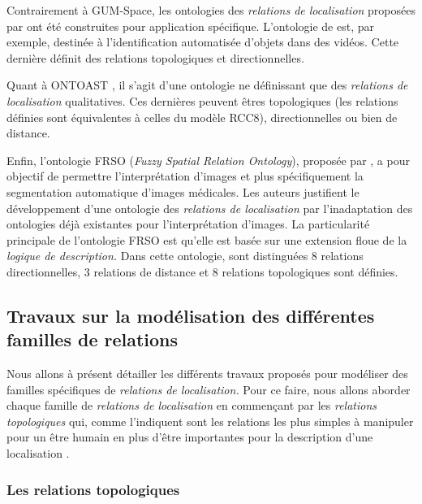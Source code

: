 Contrairement à GUM-Space, les ontologies des \emph{relations de
  localisation} proposées par
\textcite{Dasiopoulou2005,Miron2007,Hudelot2008a} ont été construites
pour application spécifique. L'ontologie de \textcite{Dasiopoulou2005}
est, par exemple, destinée à l'identification automatisée d'objets
dans des vidéos. Cette dernière définit des relations topologiques et
directionnelles.

Quant à ONTOAST \autocite{Miron2007}, il s'agit d'une ontologie ne
définissant que des \emph{relations de localisation} qualitatives. Ces
dernières peuvent êtres topologiques (les relations définies sont
équivalentes à celles du modèle RCC8), directionnelles ou bien de
distance.

Enfin, l'ontologie FRSO (\emph{Fuzzy Spatial Relation Ontology}),
proposée par \textcite{Hudelot2008a}, a pour objectif de permettre
l’interprétation d'images et plus spécifiquement la segmentation
automatique d'images médicales. Les auteurs justifient le
développement d'une ontologie des \emph{relations de localisation} par
l'inadaptation des ontologies déjà existantes pour l'interprétation
d'images.
%
La particularité principale de l'ontologie FRSO est qu'elle est basée
sur une extension floue de la \emph{logique de description.}
%
Dans cette ontologie, sont distinguées 8 relations directionnelles, 3
relations de distance et 8 relations topologiques sont définies.

\subsection{Travaux sur la modélisation des différentes familles de
  relations}

Nous allons à présent détailler les différents travaux proposés pour
modéliser des familles spécifiques de \emph{relations de
  localisation.} Pour ce faire, nous allons aborder chaque famille de
\emph{relations de localisation} en commençant par les \emph{relations
  topologiques} qui, comme l'indiquent \textcite{Aurnague1997} sont
les relations les plus simples à manipuler pour un être humain en plus
d'être importantes pour la description d'une localisation
\autocite{Egenhofer1995}.

\subsubsection{Les relations topologiques}



